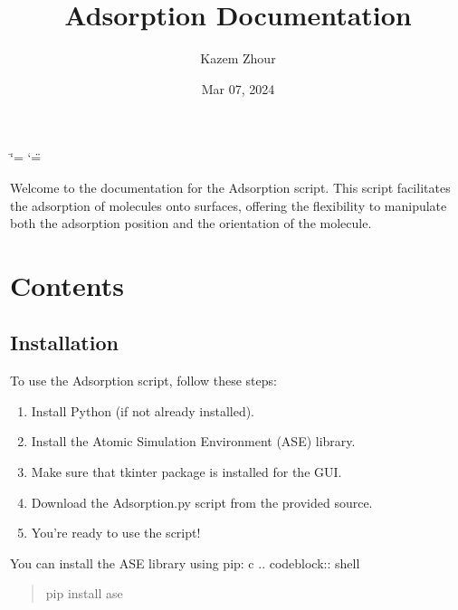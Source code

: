\documentclass[letterpaper,10pt,english]{sphinxmanual}
\title{Adsorption Documentation}
\date{Mar 07, 2024}
\author{Kazem Zhour}
\begin{document}
\ifdefined\shorthandoff
  \ifnum\catcode`\=\string=\active\shorthandoff{=}\fi
  \ifnum\catcode`\"=\active{}\fi
\fi

\pagestyle{empty}
\sphinxmaketitle
\pagestyle{plain}
\sphinxtableofcontents
\pagestyle{normal}
\label{\detokenize{index::doc}}



\sphinxAtStartPar
Welcome to the documentation for the Adsorption script. This script facilitates the adsorption of molecules onto surfaces, offering the flexibility to manipulate both the adsorption position and the orientation of the molecule.


\chapter{Contents}
\label{\detokenize{index:contents}}
\sphinxstepscope


\section{Installation}
\label{\detokenize{installation:installation}}\label{\detokenize{installation::doc}}
\sphinxAtStartPar
To use the Adsorption script, follow these steps:
\begin{enumerate}
%
\item {} 
\sphinxAtStartPar
Install Python (if not already installed).

\item {} 
\sphinxAtStartPar
Install the Atomic Simulation Environment (ASE) library.

\item {} 
\sphinxAtStartPar
Make sure that tkinter package is installed for the GUI.

\item {} 
\sphinxAtStartPar
Download the Adsorption.py script from the provided source.

\item {} 
\sphinxAtStartPar
You’re ready to use the script!

\end{enumerate}

\sphinxAtStartPar
You can install the ASE library using pip:
c
.. code\sphinxhyphen{}block:: shell
\begin{quote}

\sphinxAtStartPar
pip install ase
\end{quote}
\end{document}
